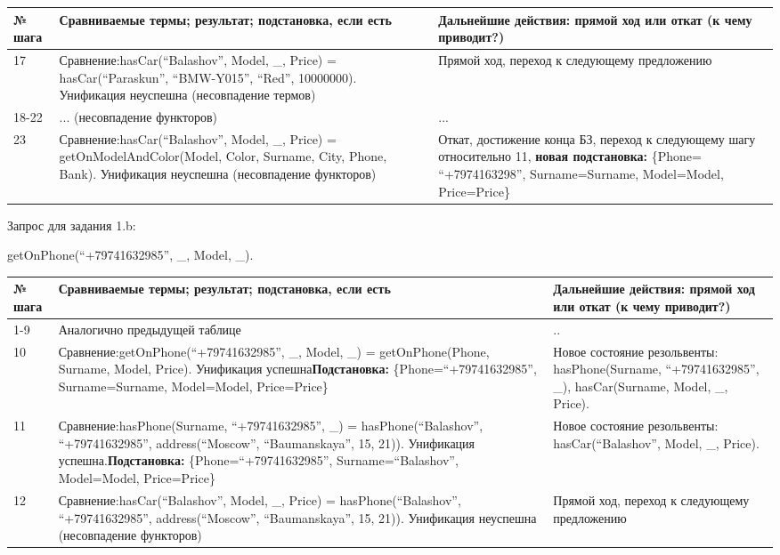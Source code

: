 \documentclass[14pt,a4paper]{scrreprt}
\begin{document}
\begin{table}[H]
	\begin{tabular}{|p{1.2cm\small}|p{9cm\small}|p{5cm\small}|}	
		\hline
		№ шага & Сравниваемые термы; результат; подстановка, если есть & Дальнейшие действия: прямой ход или откат (к чему приводит?)\\
		\hline
		17 & Сравнение:\linebreak hasCar(``Balashov'', Model, \_, Price) = hasCar(``Paraskun'', ``BMW-Y015'', ``Red'', 10000000). Унификация неуспешна (несовпадение термов) & Прямой ход, переход к следующему предложению\\
		\hline
		18-22 & ... (несовпадение функторов) & ...\\
		\hline
		23 & Сравнение:\linebreak hasCar(``Balashov'', Model, \_, Price) = getOnModelAndColor(Model, Color, Surname, City, Phone, Bank). Унификация неуспешна (несовпадение функторов) & Откат, достижение конца БЗ, переход к следующему шагу относительно 11, \textbf{новая подстановка:} \{Phone=
		``+7974163298'', Surname=Surname, Model=Model, Price=Price\}\\
		\hline
	\end{tabular}
\end{table}

Запрос для задания 1.b:

getOnPhone(``+79741632985'', \_, Model, \_).

\begin{table}[H]
	\begin{tabular}{|p{1.2cm\small}|p{9cm\small}|p{5cm\small}|}	
		\hline
		№ шага & Сравниваемые термы; результат; подстановка, если есть & Дальнейшие действия: прямой ход или откат (к чему приводит?)\\
		\hline
		1-9 & Аналогично предыдущей таблице & ..\\
		\hline
		10 & Сравнение:\linebreak getOnPhone(``+79741632985'', \_, Model, \_) = getOnPhone(Phone, Surname, Model, Price). Унификация успешна\linebreak \textbf{Подстановка:} \{Phone=``+79741632985'', Surname=Surname, Model=Model, Price=Price\} &  Новое состояние резольвенты: hasPhone(Surname, ``+79741632985'', \_), hasCar(Surname, Model, \_, Price).\\ 
		\hline
		11 & Сравнение:\linebreak hasPhone(Surname, ``+79741632985'', \_) = hasPhone(``Balashov'', ``+79741632985'', address(``Moscow'', ``Baumanskaya'', 15, 21)). Унификация успешна.\linebreak \textbf{Подстановка:} \{Phone=``+79741632985'', Surname=``Balashov'', Model=Model, Price=Price\} & Новое состояние резольвенты: hasCar(``Balashov'', Model, \_, Price). \\
		\hline
		12 & Сравнение:\linebreak hasCar(``Balashov'', Model, \_, Price) = hasPhone(``Balashov'', ``+79741632985'', address(``Moscow'', ``Baumanskaya'', 15, 21)). Унификация неуспешна (несовпадение функторов) & Прямой ход, переход к следующему предложению\\
		\hline
	\end{tabular}
\end{table}
\end{document}
